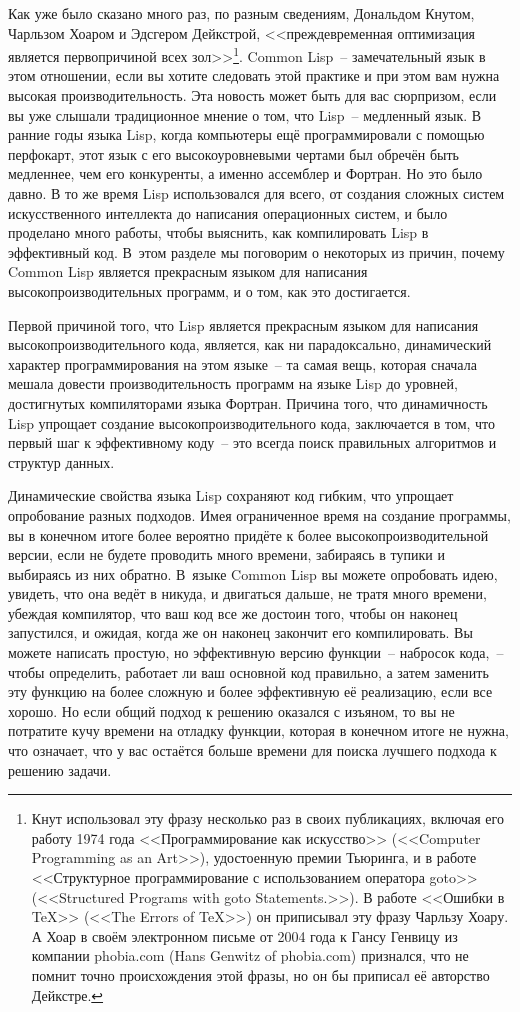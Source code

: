 Как уже было сказано много раз, по разным сведениям, Дональдом Кнутом, Чарльзом Хоаром и
Эдсгером Дейкстрой, <<преждевременная оптимизация является первопричиной всех
зол>>\footnote{Кнут использовал эту фразу несколько раз в своих публикациях, включая его
  работу 1974 года <<Программирование как искусство>> (<<Computer Programming as an
  Art>>), удостоенную премии Тьюринга, и в работе <<Структурное программирование с
  использованием оператора goto>> (<<Structured Programs with goto Statements.>>). В
  работе <<Ошибки в TeX>> (<<The Errors of TeX>>) он приписывал эту фразу Чарльзу Хоару.
  А Хоар в своём электронном письме от 2004 года к Гансу Генвицу из компании phobia.com
  (Hans Genwitz of phobia.com) признался, что не помнит точно происхождения этой фразы, но
  он бы приписал её авторство Дейкстре.}. Common Lisp~-- замечательный язык в этом
отношении, если вы хотите следовать этой практике и при этом вам нужна высокая
производительность. Эта новость может быть для вас сюрпризом, если вы уже слышали
традиционное мнение о том, что Lisp~-- медленный язык. В ранние годы языка Lisp, когда
компьютеры ещё программировали с помощью перфокарт, этот язык с его высокоуровневыми
чертами был обречён быть медленнее, чем его конкуренты, а именно ассемблер и Фортран. Но
это было давно. В то же время Lisp использовался для всего, от создания сложных систем
искусственного интеллекта до написания операционных систем, и было проделано много
работы, чтобы выяснить, как компилировать Lisp в эффективный код.  В~этом разделе мы
поговорим о некоторых из причин, почему Common Lisp является прекрасным языком для
написания высокопроизводительных программ, и о том, как это достигается.

Первой причиной того, что Lisp является прекрасным языком для написания
высокопроизводительного кода, является, как ни парадоксально, динамический характер
программирования на этом языке~-- та самая вещь, которая сначала мешала довести
производительность программ на языке Lisp до уровней, достигнутых компиляторами языка
Фортран. Причина того, что динамичность Lisp упрощает создание высокопроизводительного
кода, заключается в том, что первый шаг к эффективному коду~-- это всегда поиск
правильных алгоритмов и структур данных.

Динамические свойства языка Lisp сохраняют код гибким, что упрощает опробование разных
подходов. Имея ограниченное время на создание программы, вы в конечном итоге более
вероятно придёте к более высокопроизводительной версии, если не будете проводить много
времени, забираясь в тупики и выбираясь из них обратно. В~языке Common Lisp вы можете
опробовать идею, увидеть, что она ведёт в никуда, и двигаться дальше, не тратя много
времени, убеждая компилятор, что ваш код все же достоин того, чтобы он наконец запустился,
и ожидая, когда же он наконец закончит его компилировать. Вы можете написать простую, но
эффективную версию функции~-- набросок кода,~-- чтобы определить, работает ли ваш
основной код правильно, а затем заменить эту функцию на более сложную и более эффективную
её реализацию, если все хорошо. Но если общий подход к решению оказался с изъяном, то вы
не потратите кучу времени на отладку функции, которая в конечном итоге не нужна, что
означает, что у вас остаётся больше времени для поиска лучшего подхода к решению задачи.

